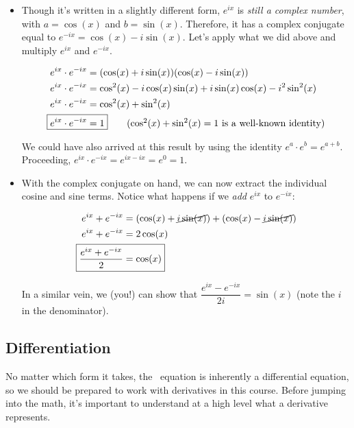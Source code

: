 \begin{itemize}
	\item Though it's written in a slightly different form, $e^{ix}$ is \emph{still a complex number}, with $a = \cos(x)$ and $b = \sin(x)$. 
	Therefore, it has a complex conjugate equal to $e^{-ix}=\cos(x) -i\sin(x)$. 
	Let's apply what we did above and multiply $e^{ix}$ and $e^{-ix}$.
	
	\begin{align*}
	e^{ix} \cdot e^{-ix} &= (\cos(x) + i\sin(x))(\cos(x)-i\sin(x)) \\
	e^{ix} \cdot e^{-ix} &= \cos^2(x) -i\cos(x)\sin(x) + i\sin(x)\cos(x) -i^2\sin^2(x) \\
	e^{ix} \cdot e^{-ix} &= \cos^2(x) + \sin^2(x) \\
	\Aboxed{e^{ix} \cdot e^{-ix} &= 1} \tag{$\cos^2(x) + \sin^2(x) = 1$ is a well-known identity}
	\end{align*}
	
	We could have also arrived at this result by using the identity $e^a \cdot e^b = e^{a+b}$. 
	Proceeding, $e^{ix} \cdot e^{-ix} = e^{ix - ix} = e^0 = 1$.
	
	\item With the complex conjugate on hand, we can now extract the individual cosine and sine terms. 
	Notice what happens if we \emph{add} $e^{ix}$ to $e^{-ix}$:
	
	\begin{align*}
	e^{ix} + e^{-ix} &= (\cos(x) + \cancel{i\sin(x)}) + (\cos(x) - \cancel{i\sin(x)}) \\
	e^{ix} + e^{-ix} &= 2\cos(x) \\
	\Aboxed{ \dfrac{e^{ix} + e^{-ix}}{2}&= \cos(x) }
	\end{align*}
	
	In a similar vein, we (you!) can show that $\boxed{\dfrac{e^{ix} - e^{-ix}}{2i} = \sin(x)}$ (note the $i$ in the denominator).
	
\end{itemize}


\subsection{Differentiation} \label{sec:calculus-diff}

No matter which form it takes, the \Sch\ equation is inherently a differential equation, so we should be prepared to work with derivatives in this course. 
Before jumping into the math, it's important to understand at a high level what a derivative represents.

